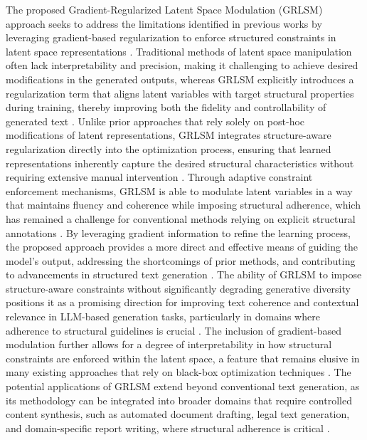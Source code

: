 \documentclass{article}
\begin{document}
The proposed Gradient-Regularized Latent Space Modulation (GRLSM) approach seeks to address the limitations identified in previous works by leveraging gradient-based regularization to enforce structured constraints in latent space representations \cite{linwood2024optimizing}. Traditional methods of latent space manipulation often lack interpretability and precision, making it challenging to achieve desired modifications in the generated outputs, whereas GRLSM explicitly introduces a regularization term that aligns latent variables with target structural properties during training, thereby improving both the fidelity and controllability of generated text \cite{ogof2024enhancing}. Unlike prior approaches that rely solely on post-hoc modifications of latent representations, GRLSM integrates structure-aware regularization directly into the optimization process, ensuring that learned representations inherently capture the desired structural characteristics without requiring extensive manual intervention \cite{kirchenbauer2024hallucination}. Through adaptive constraint enforcement mechanisms, GRLSM is able to modulate latent variables in a way that maintains fluency and coherence while imposing structural adherence, which has remained a challenge for conventional methods relying on explicit structural annotations \cite{wong2024efficiency}. By leveraging gradient information to refine the learning process, the proposed approach provides a more direct and effective means of guiding the model’s output, addressing the shortcomings of prior methods, and contributing to advancements in structured text generation \cite{cabeleireiro2024dynamic, pedicir2024novel}. The ability of GRLSM to impose structure-aware constraints without significantly degrading generative diversity positions it as a promising direction for improving text coherence and contextual relevance in LLM-based generation tasks, particularly in domains where adherence to structural guidelines is crucial \cite{kanax2024contextualized}. The inclusion of gradient-based modulation further allows for a degree of interpretability in how structural constraints are enforced within the latent space, a feature that remains elusive in many existing approaches that rely on black-box optimization techniques \cite{mou2024contextual,yilar2024recursive}. The potential applications of GRLSM extend beyond conventional text generation, as its methodology can be integrated into broader domains that require controlled content synthesis, such as automated document drafting, legal text generation, and domain-specific report writing, where structural adherence is critical \cite{ zablocki2024assessing}.
\end{document}
